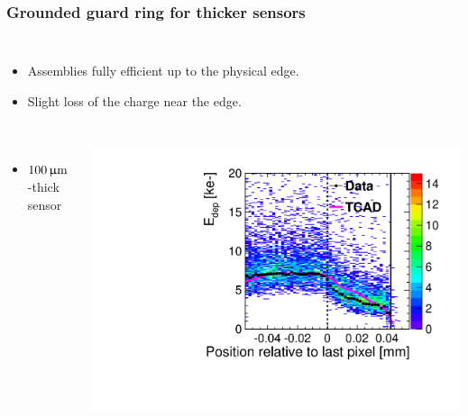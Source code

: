 \begin{frame}
  \frametitle{Grounded guard ring for thicker sensors}

  \begin{columns}
    \begin{itemize}
    \item Assemblies fully efficient up to the physical edge.
    \item Slight loss of the charge near the edge.
    \end{itemize}

    \centering
  \end{columns}

  \begin{columns}
    \begin{itemize}
    \item $100\,\upmu\mathrm{m}$-thick sensor
    \end{itemize}
    \centering
    \includegraphics[width=\textwidth]{../figures/ActiveEdge/55_GNDGR_100_Edep_TCAD_data.pdf}


\end{columns}
\end{frame}
